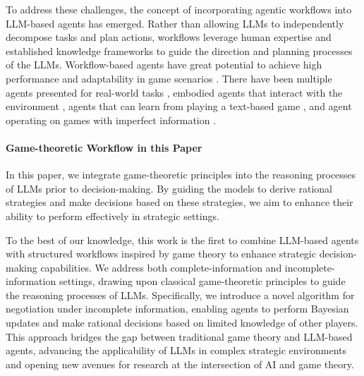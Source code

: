 To address these challenges, the concept of incorporating agentic workflows \cite{wu2024stateflow, zeng2023flowmind, xiao2024flowbench, li2024autoflow, li2023metaagents} into LLM-based agents has emerged. Rather than allowing LLMs to independently decompose tasks and plan actions, workflows leverage human expertise and established knowledge frameworks to guide the direction and planning processes of the LLMs. Workflow-based agents have great potential to achieve high performance and adaptability in game scenarios \citep{xi2023rise}. There have been multiple agents presented for real-world tasks \citep{jimenez2023swe, yang2024swe}, embodied agents that interact with the environment \citep{wang2023voyager, zhu2023ghost}, agents that can learn from playing a text-based game \citep{xu2023language}, and agent operating on games with imperfect information \citep{guo2023suspicion}.

\paragraph{Game-theoretic Workflow in this Paper} In this paper, we integrate game-theoretic principles into the reasoning processes of LLMs prior to decision-making. By guiding the models to derive rational strategies and make decisions based on these strategies, we aim to enhance their ability to perform effectively in strategic settings.

To the best of our knowledge, this work is the first to combine LLM-based agents with structured workflows inspired by game theory to enhance strategic decision-making capabilities. We address both complete-information and incomplete-information settings, drawing upon classical game-theoretic principles to guide the reasoning processes of LLMs. Specifically, we introduce a novel algorithm for negotiation under incomplete information, enabling agents to perform Bayesian updates and make rational decisions based on limited knowledge of other players. This approach bridges the gap between traditional game theory and LLM-based agents, advancing the applicability of LLMs in complex strategic environments and opening new avenues for research at the intersection of AI and game theory.
